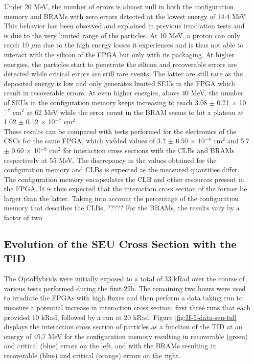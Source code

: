       Under 20 MeV, the number of errors is almost null in both the configuration memory and BRAMs with zero errors detected at the lowest energy of 14.4 MeV. This behavior has been observed and explained in previous irradiation tests \cite{Bylsma2013242, Huhtinen2000155} and is due to the very limited range of the particles. At 10 MeV, a proton can only reach 10 $\mu$m due to the high energy losses it experiences and is thus not able to interact with the silicon of the FPGA but only with its packaging. At higher energies, the particles start to penetrate the silicon and recoverable errors are detected while critical errors are still rare events. The latter are still rare as the deposited energy is low and only generates limited SEUs in the FPGA which result in recoverable errors. At even higher energies, above 40 MeV, the number of SEUs in the configuration memory keeps increasing to reach 3.08 $\pm$ 0.21 $ \times $ 10$^{-7}$ cm$^{2}$ at 62 MeV while the error count in the BRAM seems to hit a plateau at 1.02 $\pm$ 0.12 $ \times $ 10$^{-7}$ cm$^2$. \\

      These results can be compared with tests performed for the electronics of the CSCs \cite{Bylsma2013242} for the same FPGA, which yielded values of 3.7 $\pm$ 0.50 $ \times $ 10$^{-8}$ cm$^2$ and 5.7 $\pm$ 0.60 $ \times $ 10$^{-8}$ cm$^2$ for interaction cross sections with the CLBs and BRAMs respectively at 55 MeV. The discrepancy in the values obtained for the configuration memory and CLBs is expected as the measured quantities differ. The configuration memory encapsulates the CLB and other resources present in the FPGA. It is thus expected that the interaction cross section of the former be larger than the latter. Taking into account the percentage of the configuration memory that describes the CLBs,
      ?????
      For the BRAMs, the results vary by a factor of two.


    \subsection{Evolution of the SEU Cross Section with the TID}

      The OptoHybrids were initially exposed to a total of 33 kRad over the course of various tests performed during the first 22h. The remaining two hours were used to irradiate the FPGAs with high fluxes and then perform a data taking run to measure a potential increase in interaction cross section: first three runs that each provided 10 kRad, followed by a run at 20 kRad. Figure \ref{fig:II-5-data-seu-tid} displays the interaction cross section of particles as a function of the TID at an energy of 49.7 MeV for the configuration memory resulting in recoverable (green) and critical (blue) errors on the left, and with the BRAMs resulting in recoverable (blue) and critical (orange) errors on the right. \\

